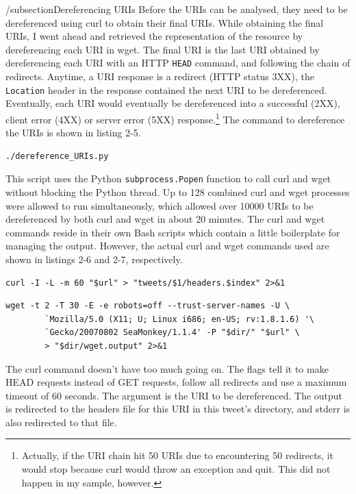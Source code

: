 \documentclass[a4paper,12pt]{article}
\begin{document}
/subsection{Dereferencing URIs}
Before the URIs can be analysed, they need to be dereferenced using curl to obtain their final URIs. While
obtaining
the final URIs, I went ahead and retrieved the representation of the resource by dereferencing each URI in
wget. The final URI is the last URI obtained by dereferencing each URI with an HTTP \texttt{HEAD} command,
and following the chain of redirects. Anytime, a URI response is a redirect (HTTP status 3XX), the \texttt{Location} header
in the response contained the next URI to be dereferenced.\cite{rfc2616} Eventually, each URI would eventually be
dereferenced into a successful (2XX), client error (4XX) or server error (5XX) response.\footnote{Actually,
if the URI chain hit 50 URIs due to encountering 50 redirects, it would stop because curl would throw an
exception and quit. This did not happen in my sample, however.} The command to dereference the URIs is shown
in listing 2-5.
\begin{lstlisting}[basicstyle=\ttfamily,caption={Dereferencing URIs}]
    ./dereference_URIs.py
\end{lstlisting}
This script uses the Python \texttt{subprocess.Popen} function to call curl and wget without blocking the
Python thread. Up to 128 combined curl and wget processes were allowed to run simultaneously, which
allowed over 10000 URIs to be dereferenced by both curl and wget in about 20 minutes. The curl and wget
commands reside in their own Bash scripts which contain a little boilerplate for managing the output.
However, the actual curl and wget commands used are shown in listings 2-6 and 2-7, respectively.
\begin{lstlisting}[basicstyle=\ttfamily,caption={Curl Command}]
    curl -I -L -m 60 "$url" > "tweets/$1/headers.$index" 2>&1
\end{lstlisting}
\begin{lstlisting}[basicstyle=\ttfamily,caption={Wget Command}]
    wget -t 2 -T 30 -E -e robots=off --trust-server-names -U \
        `Mozilla/5.0 (X11; U; Linux i686; en-US; rv:1.8.1.6) '\
        `Gecko/20070802 SeaMonkey/1.1.4' -P "$dir/" "$url" \
        > "$dir/wget.output" 2>&1
\end{lstlisting}
The curl command doesn't have too much going on. The flags tell it to make HEAD requests instead of GET
requests, follow all redirects and use a maximum timeout of 60 seconds. The argument is the URI to be
dereferenced. The output is redirected to the headers file for this URI in this tweet's directory,
and stderr is also redirected to that file.
\end{document}
